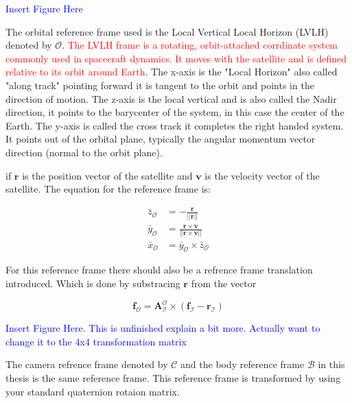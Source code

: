 \textcolor{blue}{Insert Figure Here}


The orbital reference frame used is the Local Vertical Local Horizon (LVLH) denoted by $\mathcal{O}$. \textcolor{red}{The LVLH frame is a rotating, orbit-attached corrdinate
system commonly used in spacecraft dynamics. It moves with the satellite and is defined relative to its orbit around Earth}. The x-axis is the "Local Horizon" also called
"along track" pointing forward it is tangent to the orbit and points in the direction of motion. The z-axis is the local vertical and is also called the Nadir direction, it points
to the barycenter of the system, in this case the center of the Earth. The y-axis is called the cross track it completes the right handed system. It points out of the orbital plane,
typically the angular momentum vector direction (normal to the orbit plane).

if $\mathbf{r}$ is the position vector of the satellite and $\mathbf{v}$ is the velocity vector of the satellite.
The equation for the reference frame is:

\begin{align}
    \bar{z}_{\mathcal{O}} &= -\frac{\mathbf{r}}{||\mathbf{r}||} \\
    \bar{y}_{\mathcal{O}} &= \frac{\mathbf{r}\times\mathbf{v}}{||\mathbf{r}\times\mathbf{v}||}\\
    \bar{x}_{\mathcal{O}} &= \bar{y}_{\mathcal{O}}\times\bar{z}_{\mathcal{O}}
\end{align}

For this reference frame there should also be a refrence frame translation introduced. Which is done by substracing $\mathbf{r}$ from the vector

\begin{equation}
    \mathbf{f}_{\mathcal{O}} = \mathbf{A}_{\mathcal{I}}^{\mathcal{O}}\times(\mathbf{f}_{\mathcal{I}} - \mathbf{r}_{\mathcal{I}})
\end{equation}

\textcolor{blue}{Insert Figure Here. This is unfinished explain a bit more. Actually want to change it to the 4x4 transformation matrix}


The camera refrence frame denoted by $\mathcal{C}$ and the body reference frame $\mathcal{B}$ in this thesis is the same reference frame. This reference frame is transformed
by using your standard quaternion rotaion matrix.

